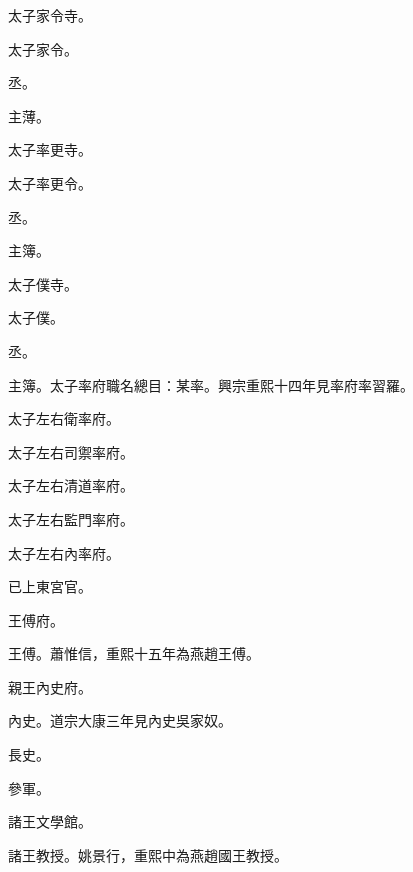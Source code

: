 \begin{pinyinscope}
 太子家令寺。



 太子家令。



 丞。



 主薄。



 太子率更寺。



 太子率更令。



 丞。



 主簿。



 太子僕寺。



 太子僕。



 丞。



 主簿。太子率府職名總目：某率。興宗重熙十四年見率府率習羅。



 太子左右衛率府。



 太子左右司禦率府。



 太子左右清道率府。



 太子左右監門率府。



 太子左右內率府。



 已上東宮官。



 王傅府。



 王傅。蕭惟信，重熙十五年為燕趙王傅。



 親王內史府。



 內史。道宗大康三年見內史吳家奴。



 長史。



 參軍。



 諸王文學館。



 諸王教授。姚景行，重熙中為燕趙國王教授。




\end{pinyinscope}
